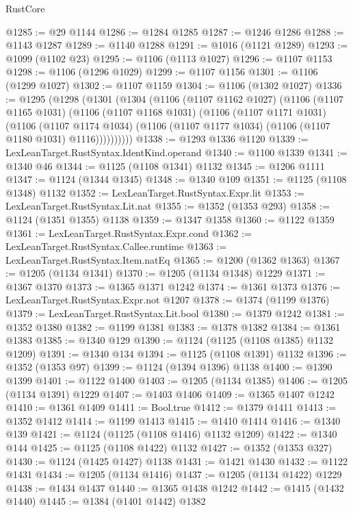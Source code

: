 \begin{lexlean}{RustCore}
\begin{coremodule}
@1285 := @29 @1144
@1286 := @1284 @1285
@1287 := @1246 @1286
@1288 := @1143 @1287
@1289 := @1140 @1288
@1291 := @1016 (@1121 @1289)
@1293 := @1099 (@1102 @23)
@1295 := @1106 (@1113 @1027)
@1296 := @1107 @1153
@1298 := @1106 (@1296 @1029)
@1299 := @1107 @1156
@1301 := @1106 (@1299 @1027)
@1302 := @1107 @1159
@1304 := @1106 (@1302 @1027)
@1336 := @1295
    (@1298
      (@1301
        (@1304
          (@1106
            (@1107 @1162 @1027)
            (@1106
              (@1107 @1165 @1031)
              (@1106
                (@1107 @1168 @1031)
                (@1106
                  (@1107 @1171 @1031)
                  (@1106
                    (@1107 @1174 @1034)
                    (@1106 (@1107 @1177 @1034) (@1106 (@1107 @1180 @1031) @1116))))))))))
@1338 := @1293 @1336 @1120
@1339 := LexLeanTarget.RustSyntax.IdentKind.operand
@1340 := @1100 @1339
@1341 := @1340 @46
@1344 := @1125 (@1108 @1341) @1132
@1345 := @1206 @1111
@1347 := @1124 (@1344 @1345)
@1348 := @1340 @109
@1351 := @1125 (@1108 @1348) @1132
@1352 := LexLeanTarget.RustSyntax.Expr.lit
@1353 := LexLeanTarget.RustSyntax.Lit.nat
@1355 := @1352 (@1353 @293)
@1358 := @1124 (@1351 @1355) @1138
@1359 := @1347 @1358
@1360 := @1122 @1359
@1361 := LexLeanTarget.RustSyntax.Expr.cond
@1362 := LexLeanTarget.RustSyntax.Callee.runtime
@1363 := LexLeanTarget.RustSyntax.Item.natEq
@1365 := @1200 (@1362 @1363)
@1367 := @1205 (@1134 @1341)
@1370 := @1205 (@1134 @1348) @1229
@1371 := @1367 @1370
@1373 := @1365 @1371 @1242
@1374 := @1361 @1373
@1376 := LexLeanTarget.RustSyntax.Expr.not @1207
@1378 := @1374 (@1199 @1376)
@1379 := LexLeanTarget.RustSyntax.Lit.bool
@1380 := @1379 @1242
@1381 := @1352 @1380
@1382 := @1199 @1381
@1383 := @1378 @1382
@1384 := @1361 @1383
@1385 := @1340 @129
@1390 := @1124 (@1125 (@1108 @1385) @1132 @1209)
@1391 := @1340 @134
@1394 := @1125 (@1108 @1391) @1132
@1396 := @1352 (@1353 @97)
@1399 := @1124 (@1394 @1396) @1138
@1400 := @1390 @1399
@1401 := @1122 @1400
@1403 := @1205 (@1134 @1385)
@1406 := @1205 (@1134 @1391) @1229
@1407 := @1403 @1406
@1409 := @1365 @1407 @1242
@1410 := @1361 @1409
@1411 := Bool.true
@1412 := @1379 @1411
@1413 := @1352 @1412
@1414 := @1199 @1413
@1415 := @1410 @1414
@1416 := @1340 @139
@1421 := @1124 (@1125 (@1108 @1416) @1132 @1209)
@1422 := @1340 @144
@1425 := @1125 (@1108 @1422) @1132
@1427 := @1352 (@1353 @327)
@1430 := @1124 (@1425 @1427) @1138
@1431 := @1421 @1430
@1432 := @1122 @1431
@1434 := @1205 (@1134 @1416)
@1437 := @1205 (@1134 @1422) @1229
@1438 := @1434 @1437
@1440 := @1365 @1438 @1242
@1442 := @1415 (@1432 @1440)
@1445 := @1384 (@1401 @1442) @1382

\end{coremodule}
\end{lexlean}
